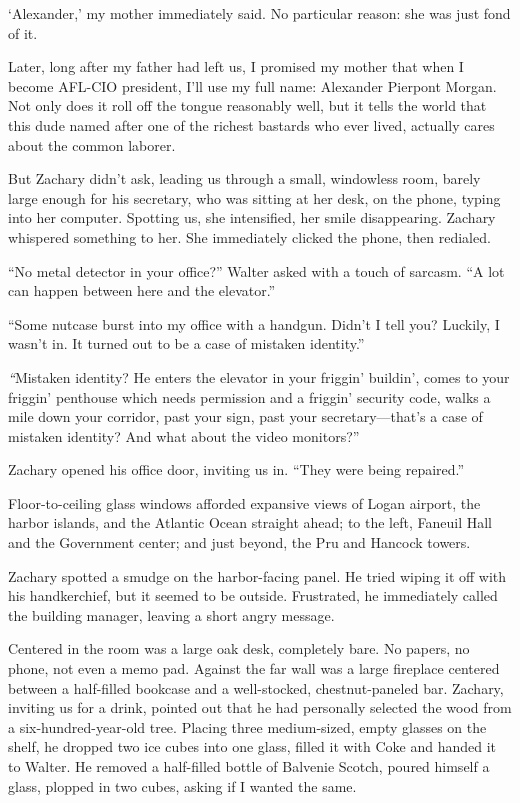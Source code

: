 `Alexander,' my mother immediately said. No particular reason: she was
just fond of it.

Later, long after my father had left us, I promised my mother that when
I become AFL-CIO president, I'll use my full name: Alexander Pierpont
Morgan. Not only does it roll off the tongue reasonably well, but it
tells the world that this dude named after one of the richest bastards
who ever lived, actually cares about the common laborer.

But Zachary didn't ask, leading us through a small, windowless room,
barely large enough for his secretary, who was sitting at her desk, on
the phone, typing into her computer. Spotting us, she intensified, her
smile disappearing. Zachary whispered something to her. She immediately
clicked the phone, then redialed.

``No metal detector in your office?'' Walter asked with a touch of
sarcasm. ``A lot can happen between here and the elevator.''

``Some nutcase burst into my office with a handgun. Didn't I tell you?
Luckily, I wasn't in. It turned out to be a case of mistaken identity.''

\emph{``}Mistaken identity? He enters the elevator in your friggin'
buildin', comes to your friggin' penthouse which needs permission and a
friggin' security code, walks a mile down your corridor, past your sign,
past your secretary---that's a case of mistaken identity? And what about
the video monitors?''

Zachary opened his office door, inviting us in. ``They were being
repaired.''

Floor-to-ceiling glass windows afforded expansive views of Logan
airport, the harbor islands, and the Atlantic Ocean straight ahead; to
the left, Faneuil Hall and the Government center; and just beyond, the
Pru and Hancock towers.

Zachary spotted a smudge on the harbor-facing panel. He tried wiping it
off with his handkerchief, but it seemed to be outside. Frustrated, he
immediately called the building manager, leaving a short angry message.

Centered in the room was a large oak desk, completely bare. No papers,
no phone, not even a memo pad. Against the far wall was a large
fireplace centered between a half-filled bookcase and a well-stocked,
chestnut-paneled bar. Zachary, inviting us for a drink, pointed out that
he had personally selected the wood from a six-hundred-year-old tree.
Placing three medium-sized, empty glasses on the shelf, he dropped two
ice cubes into one glass, filled it with Coke and handed it to Walter.
He removed a half-filled bottle of Balvenie Scotch, poured himself a
glass, plopped in two cubes, asking if I wanted the same.

